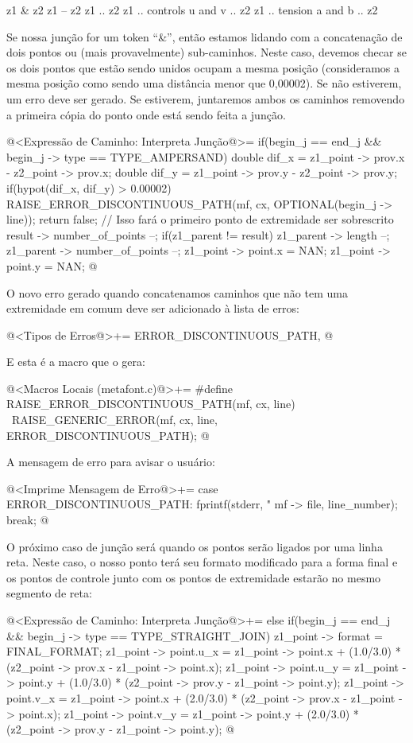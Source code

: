 {{{{{{\alinhaverbatim
z1 & z2
z1 -- z2
z1 .. z2
z1 .. controls u and v .. z2
z1 .. tension a and b .. z2
\alinhanormal

Se nossa junção for um token ``\&'', então estamos lidando com a
concatenação de dois pontos ou (mais provavelmente)
sub-caminhos. Neste caso, devemos checar se os dois pontos que estão
sendo unidos ocupam a mesma posição (consideramos a mesma posição como
sendo uma distância menor que 0,00002). Se não estiverem, um erro deve
ser gerado. Se estiverem, juntaremos ambos os caminhos removendo a
primeira cópia do ponto onde está sendo feita a junção.

\iniciocodigo
@<Expressão de Caminho: Interpreta Junção@>=
if(begin_j == end_j && begin_j -> type == TYPE_AMPERSAND){
  double dif_x = z1_point -> prov.x - z2_point -> prov.x;
  double dif_y = z1_point -> prov.y - z2_point -> prov.y;
  if(hypot(dif_x, dif_y) > 0.00002){
    RAISE_ERROR_DISCONTINUOUS_PATH(mf, cx, OPTIONAL(begin_j -> line));
    return false;
  }
  // Isso fará o primeiro ponto de extremidade ser sobrescrito
  result -> number_of_points --;
  if(z1_parent != result){
    z1_parent -> length --;
    z1_parent -> number_of_points --;
  }
  z1_point -> point.x = NAN;
  z1_point -> point.y = NAN;
}
@
\fimcodigo

O novo erro gerado quando concatenamos caminhos que não tem uma
extremidade em comum deve ser adicionado à lista de erros:

\iniciocodigo
@<Tipos de Erros@>+=
ERROR_DISCONTINUOUS_PATH,
@
\fimcodigo

E esta é a macro que o gera:

\iniciocodigo
@<Macros Locais (metafont.c)@>+=
#define RAISE_ERROR_DISCONTINUOUS_PATH(mf, cx, line) {\
  RAISE_GENERIC_ERROR(mf, cx, line, ERROR_DISCONTINUOUS_PATH);}
@
\fimcodigo

A mensagem de erro para avisar o usuário:

\iniciocodigo
@<Imprime Mensagem de Erro@>+=
case ERROR_DISCONTINUOUS_PATH:
  fprintf(stderr,
          "%
          mf -> file, line_number);
  break;
@
\fimcodigo

O próximo caso de junção será quando os pontos serão ligados por uma
linha reta. Neste caso, o nosso ponto terá seu formato modificado para
a forma final e os pontos de controle junto com os pontos de
extremidade estarão no mesmo segmento de reta:

\iniciocodigo
@<Expressão de Caminho: Interpreta Junção@>+=
else if(begin_j == end_j && begin_j -> type == TYPE_STRAIGHT_JOIN){
  z1_point -> format = FINAL_FORMAT;
  z1_point -> point.u_x = z1_point -> point.x + (1.0/3.0) *
                         (z2_point -> prov.x - z1_point -> point.x);
  z1_point -> point.u_y = z1_point -> point.y + (1.0/3.0) *
                         (z2_point -> prov.y - z1_point -> point.y);
  z1_point -> point.v_x = z1_point -> point.x + (2.0/3.0) *
                         (z2_point -> prov.x - z1_point -> point.x);
  z1_point -> point.v_y = z1_point -> point.y + (2.0/3.0) *
                         (z2_point -> prov.y - z1_point -> point.y);
}
@
\fimcodigo

}}}}}}
